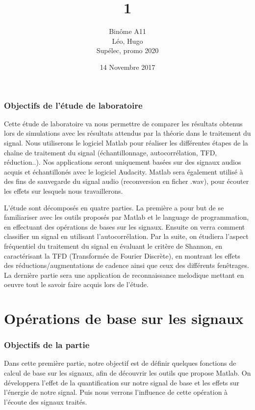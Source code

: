\documentclass[french]{article}
\title{\bsc{SIG} 1}
\author{Binôme A11 \\ \bsc{Simon} Léo, \bsc{Levy--Falk} Hugo \\ Supélec, promo 2020}
\date{14 Novembre 2017}
\begin{document}
\maketitle
\tableofcontents
\clearpage
\listoffigures
\newpage
{}

\section*{Objectifs de l'étude de laboratoire}
Cette étude de laboratoire va nous permettre de comparer les résultats obtenus lors de simulations avec les résultats attendus par la théorie dans le traitement du signal. Nous utiliserons le logiciel Matlab pour réaliser les différentes étapes de la chaîne de traitement du signal (échantillonnage, autocorrélation, TFD, réduction..). Nos applications seront uniquement basées sur des signaux audios acquis et échantillonés avec le logiciel Audacity. Matlab sera également utilisé à des fins de sauvegarde du signal audio (reconversion en ficher .wav), pour écouter les effets sur lesquels nous travaillerons.

L'étude sont décomposés en quatre parties. La première a pour but de se familiariser avec les outils proposés par Matlab et le language de programmation, en effectuant des opérations de bases sur les signaux. Ensuite on verra comment classifier un signal en utilisant l'autocorrélation. Par la suite, on étudiera l'aspect fréquentiel du traitement du signal en évaluant le critère de Shannon, en caractérisant la TFD (Transformée de Fourier Discrète), en montrant les effets des réductions/augmentations de cadence ainsi que ceux des différents fenêtrages. La dernière partie sera une application de reconnaissance melodique mettant en oeuvre tout le savoir faire acquis lors de l'étude.

\newpage

\part{Opérations de base sur les signaux}

\section*{Objectifs de la partie}
Dans cette première partie, notre objectif est de définir quelques fonctions de calcul de base sur les signaux, afin de découvrir les outils que propose Matlab. On développera l'effet de la quantification sur notre signal de base et les effets sur l'énergie de notre signal. Puis nous verrons l'influence de cette opération à l'écoute des signaux traités.
\end{document}
